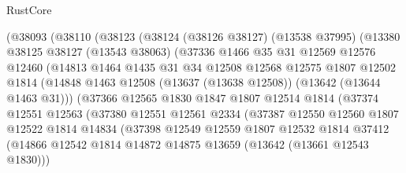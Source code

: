 \begin{lexlean}{RustCore}
\begin{coremodule}
              (@38093
                (@38110
                  (@38123
                    (@38124
                      (@38126 @38127)
                      (@13538 @37995)
                      (@13380
                        @38125
                        @38127
                        (@13543 @38063)
                        (@37336
                          @1466
                          @35
                          @31
                          @12569
                          @12576
                          @12460
                          (@14813
                            @1464
                            @1435
                            @31
                            @34
                            @12508
                            @12568
                            @12575
                            @1807
                            @12502
                            @1814
                            (@14848
                              @1463
                              @12508
                              (@13637 (@13638 @12508))
                              (@13642 (@13644 @1463 @31)))
                            (@37366
                              @12565
                              @1830
                              @1847
                              @1807
                              @12514
                              @1814
                              (@37374
                                @12551
                                @12563
                                (@37380
                                  @12551
                                  @12561
                                  @2334
                                  (@37387
                                    @12550
                                    @12560
                                    @1807
                                    @12522
                                    @1814
                                    @14834
                                    (@37398
                                      @12549
                                      @12559
                                      @1807
                                      @12532
                                      @1814
                                      @37412
                                      (@14866
                                        @12542
                                        @1814
                                        @14872
                                        @14875
                                        @13659
                                        (@13642 (@13661 @12543 @1830)))

\end{coremodule}
\end{lexlean}
